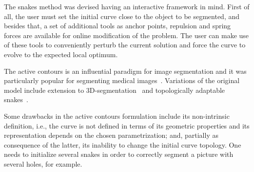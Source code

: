 The snakes method was devised having an interactive framework in mind. First of all, the user must set the initial curve close to the object to be segmented, and besides that, a set of additional tools as anchor points, repulsion and spring forces are available for online modification of the problem. The user can make use of these tools to conveniently perturb the current solution and force the curve to evolve to the expected local optimum.

The active contours is an influential paradigm for image segmentation and it was particularly popular for segmenting medical images~\cite{mcinerney99}. Variations of the original model include extension to 3D-segmentation~\cite{mcinemey99} and topologically adaptable snakes~\cite{mcinerney95}.

Some drawbacks in the active contours formulation include its non-intrinsic definition, i.e., the curve is not defined in terms of its geometric properties and its representation depends on the chosen parametrization; and, partially as consequence of the latter, its inability to change the initial curve topology. One needs to initialize several snakes in order to correctly segment a picture with several holes, for example. 



 
 
